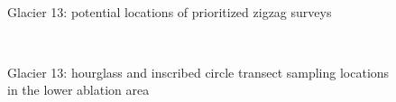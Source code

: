 \documentclass{sfuthesis}
\begin{document}
\begin{appendices}
	\begin{figure}[H]
	\centering
	\\
\caption[]{Glacier 13: potential locations of prioritized zigzag surveys}
\end{figure}
	\begin{figure}[H]
	\centering
	\\
\caption[]{Glacier 13: hourglass and inscribed circle transect sampling locations in the lower ablation area}
\end{figure}
	\begin{figure}[H]
	\centering

\end{figure}
\end{appendices}
\end{document}

